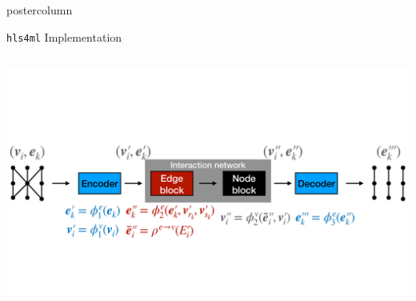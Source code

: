 \documentclass[final,hyperref={pdfpagelabels=false}]{beamer}
\newcommand{\hlsfml}{{\texttt{hls4ml}}\xspace}
\begin{document}
\begin{frame}
\begin{columns}
\begin{column}{.49\textwidth}
\begin{beamercolorbox}[center,wd=\textwidth]{postercolumn}
\begin{minipage}[T]{.95\textwidth}
{\begin{block}{{\hlsfml} Implementation}
\begin{columns}
\begin{column}{.49\textwidth}
\begin{center}
                  \includegraphics[width=0.9\linewidth]{hls4ml_GNN.pdf}
                \end{center}
              \end{column}
              \end{columns}
            \end{block}
            
}
\end{minipage}
\end{beamercolorbox}
\end{column}
\end{columns}
\end{frame}
\end{document}
